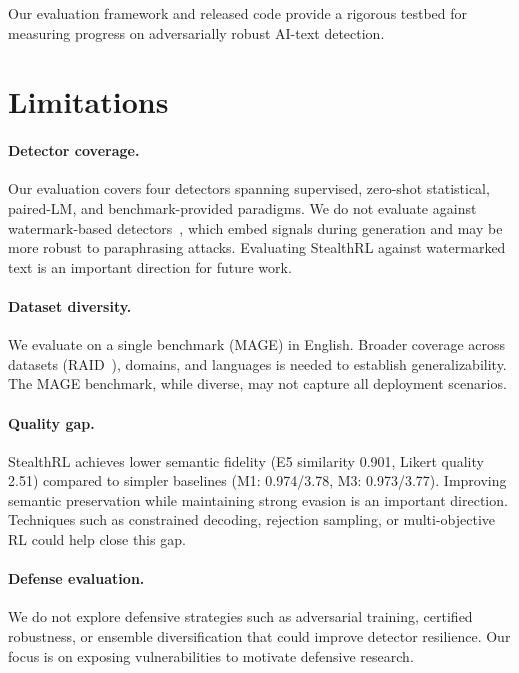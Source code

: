 \documentclass[11pt]{article}
\begin{document}
Our evaluation framework and released code provide a rigorous testbed for measuring progress on adversarially robust AI-text detection.

\section{Limitations}
\label{sec:limitations}

\paragraph{Detector coverage.} Our evaluation covers four detectors spanning supervised, zero-shot statistical, paired-LM, and benchmark-provided paradigms. We do not evaluate against watermark-based detectors~\cite{kirchenbauer2023watermark}, which embed signals during generation and may be more robust to paraphrasing attacks. Evaluating StealthRL against watermarked text is an important direction for future work.

\paragraph{Dataset diversity.} We evaluate on a single benchmark (MAGE) in English. Broader coverage across datasets (RAID~\cite{dugan2024raidsharedbenchmarkrobust}), domains, and languages is needed to establish generalizability. The MAGE benchmark, while diverse, may not capture all deployment scenarios.

\paragraph{Quality gap.} StealthRL achieves lower semantic fidelity (E5 similarity 0.901, Likert quality 2.51) compared to simpler baselines (M1: 0.974/3.78, M3: 0.973/3.77). Improving semantic preservation while maintaining strong evasion is an important direction. Techniques such as constrained decoding, rejection sampling, or multi-objective RL could help close this gap.

\paragraph{Defense evaluation.} We do not explore defensive strategies such as adversarial training, certified robustness, or ensemble diversification that could improve detector resilience. Our focus is on exposing vulnerabilities to motivate defensive research.
\end{document}

